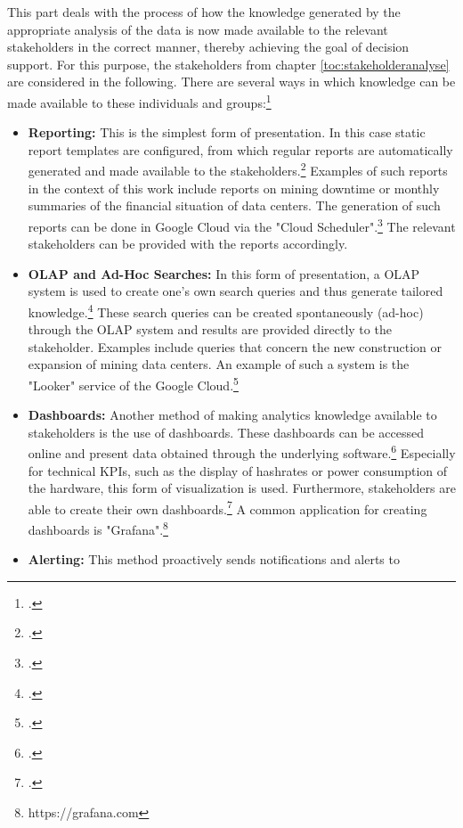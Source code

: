 This part deals with the process of how the knowledge generated by the appropriate analysis of the data is now made available to the
relevant stakeholders in the correct manner, thereby achieving the goal of decision support.
For this purpose, the stakeholders from chapter \ref{toc:stakeholderanalyse} are considered in the following. There are several
ways in which knowledge can be made available to these individuals and groups:\footcite[Cf.][Chap. 19]{loshin2012business}
\begin{itemize}
    \item \textbf{Reporting: }This is the simplest form of presentation. In this case
    static report templates are configured, from which regular reports are automatically generated and made available to the stakeholders.\footcite[Cf.][p. 305]{loshin2012business}
    Examples of such reports in the context of this work include reports on mining downtime
    or monthly summaries of the financial situation of data centers. The generation of such reports can be done in
    Google Cloud via the "Cloud Scheduler".\footcite[Cf.][]{googlecloud2021scheduler} The relevant stakeholders can be provided with the reports accordingly.
    \item \textbf{\ac{OLAP} and Ad-Hoc Searches: }In this form of presentation, a \ac{OLAP} system is used to create one's own search queries
    and thus generate tailored knowledge.\footcite[Cf.][pp. 308]{loshin2012business}
    These search queries can be created spontaneously (ad-hoc) through the \ac{OLAP} system
    and results are provided directly to the stakeholder. Examples include queries that concern the new construction or
    expansion of mining data centers. An example of such a system is the "Looker" service of the
    Google Cloud.\footcite[Cf.][]{googlecloud2021dw}
    \item \textbf{Dashboards: }Another method of making analytics knowledge available to stakeholders
    is the use of dashboards. These dashboards
    can be accessed online and present data obtained through the underlying software.\footcite[Cf.][pp. 314]{loshin2012business} Especially for
    technical \acp{KPI}, such as the display of hashrates or power consumption of the hardware, this form of
    visualization is used. Furthermore, stakeholders are able to create their own dashboards.\footcite[Cf.][pp. 314]{loshin2012business}
    A common application for creating dashboards is "Grafana".\footnote{https://grafana.com}
    \item \textbf{Alerting: }This method proactively sends notifications and alerts to

\end{itemize}
